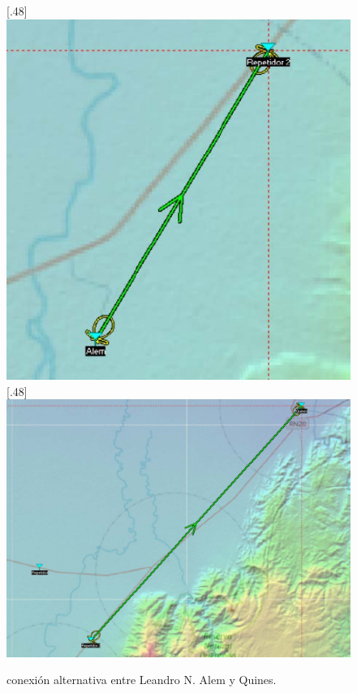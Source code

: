 \documentclass[11pt,a4paper]{article}
\begin{document}
\begin{figure}[ht!]
  \centering
  [.48\linewidth]{\includegraphics[height=11\baselineskip]{fotos_ema/con_alt_alem_rep.jpg}}%
  [.48\linewidth]{\includegraphics[height=11\baselineskip]{fotos_ema/con_alt_rep_quines.jpg}}
  \caption{conexión alternativa entre Leandro N. Alem y Quines.}
  \label{fig:con_alt}
\end{figure}
\end{document}
